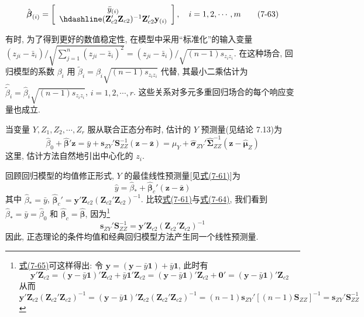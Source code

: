 
\label{eq:7-63}
\begin{equation}
\hat{\boldsymbol{\beta}}_{(i)}=\left[\begin{array}{c}\bar{y}_{(i)}\\\hdashline(\mathbf{Z}_{c2}'\mathbf{Z}_{c2})^{-1}\mathbf{Z}_{c2}'\mathbf{y}_{(i)}\end{array}\right],\quad i=1,2,\cdots,m \tag{7-63}
\end{equation}

有时, 为了得到更好的数值稳定性, 在模型中采用“标准化”的输入变量 $(z_{ji}-\bar{z}_i)\Big/\sqrt{\sum_{j=1}^{n}(z_{ji}-\bar{z}_i)^2}=(z_{ji}-\bar{z}_i)/\sqrt{(n-1)s_{z_iz_i}}$. 在这种场合, 回归模型的系数 $\beta_i$ 用 $\tilde{\beta}_i=\beta_i\sqrt{(n-1)s_{z_iz_i}}$ 代替, 其最小二乘估计为 $\hat{\tilde{\beta}}_i=\hat{\beta}_i\sqrt{(n-1)s_{z_iz_i}}$, $i=1,2,\cdots,r$. 这些关系对多元多重回归场合的每个响应变量也成立.


当变量 $Y,Z_1,Z_2,\cdots,Z_r$ 服从联合正态分布时, 估计的 $Y$ 预测量(见结论 7.13)为
\label{eq:7-64}
\begin{equation}
\hat{\beta}_0+\hat{\boldsymbol{\beta}}'\mathbf{z}=\bar{y}+\mathbf{s}_{ZY}'\mathbf{S}_{ZZ}^{-1}(\mathbf{z}-\bar{\mathbf{z}})=\hat{\mu}_Y+\hat{\boldsymbol{\sigma}}_{ZY}'\hat{\boldsymbol{\Sigma}}_{ZZ}^{-1}(\mathbf{z}-\hat{\boldsymbol{\mu}}_Z) \tag{7-64}
\end{equation}
这里, 估计方法自然地引出中心化的 $z_i$.

回顾回归模型的均值修正形式, $Y$ 的最佳线性预测量[见\hyperref[eq:7-61]{式(7-61)}]为
\[
\hat{y}=\hat{\beta}_*+\hat{\boldsymbol{\beta}}_c'(\mathbf{z}-\bar{\mathbf{z}})
\]
其中 $\hat{\beta}_*=\bar{y}$, $\hat{\boldsymbol{\beta}}_c'=\mathbf{y}'\mathbf{Z}_{c2}(\mathbf{Z}_{c2}'\mathbf{Z}_{c2})^{-1}$. 比较\hyperref[eq:7-61]{式(7-61)}与\hyperref[eq:7-64]{式(7-64)}, 我们看到 $\hat{\beta}_*=\bar{y}=\hat{\beta}_0$ 和 $\hat{\boldsymbol{\beta}}_c=\hat{\boldsymbol{\beta}}$, 因为\footnote{{\footnotesize \hyperref[eq:7-65]{式(7-65)}可这样得出: 令 $\mathbf{y}=(\mathbf{y}-\bar{y}\mathbf{1})+\bar{y}\mathbf{1}$, 此时有
\[
\mathbf{y}'\mathbf{Z}_{c2}=(\mathbf{y}-\bar{y}\mathbf{1})'\mathbf{Z}_{c2}+\bar{y}\mathbf{1}'\mathbf{Z}_{c2}=(\mathbf{y}-\bar{y}\mathbf{1})'\mathbf{Z}_{c2}+\mathbf{0}'=(\mathbf{y}-\bar{y}\mathbf{1})'\mathbf{Z}_{c2}
\]
从而
\[
\mathbf{y}'\mathbf{Z}_{c2}(\mathbf{Z}_{c2}'\mathbf{Z}_{c2})^{-1}=(\mathbf{y}-\bar{y}\mathbf{1})'\mathbf{Z}_{c2}(\mathbf{Z}_{c2}'\mathbf{Z}_{c2})^{-1}=(n-1)\mathbf{s}_{ZY}'[(n-1)\mathbf{S}_{ZZ}]^{-1}=\mathbf{s}_{ZY}'\mathbf{S}_{ZZ}^{-1}
\]}}
\label{eq:7-65}
\begin{equation}
\mathbf{s}_{ZY}'\mathbf{S}_{ZZ}^{-1}=\mathbf{y}'\mathbf{Z}_{c2}(\mathbf{Z}_{c2}'\mathbf{Z}_{c2})^{-1} \tag{7-65}
\end{equation}
因此, 正态理论的条件均值和经典回归模型方法产生同一个线性预测量.

